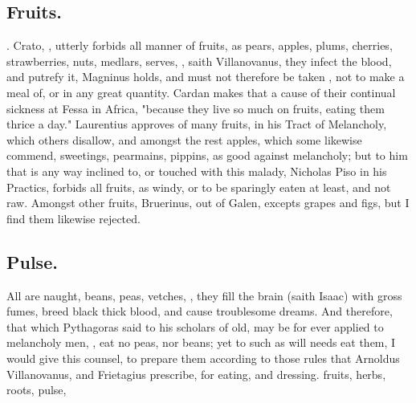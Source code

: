 \subsection{Fruits.}
. Crato,
, utterly forbids all manner of
fruits, as pears, apples, plums, cherries, strawberries, nuts, medlars, serves,
\etc{} , saith Villanovanus, they infect the blood, and
putrefy it, Magninus holds, and must not therefore be taken , not to make a meal of, or in any great quantity.
Cardan makes that a cause of their continual sickness at
Fessa in Africa, "because they live so much on fruits, eating them thrice a
day." Laurentius approves of many fruits, in his Tract of Melancholy, which
others disallow, and amongst the rest apples, which some likewise commend,
sweetings, pearmains, pippins, as good against melancholy; but to him that is
any way inclined to, or touched with this malady, Nicholas
Piso in his Practics, forbids all fruits, as windy, or to be sparingly eaten at
least, and not raw. Amongst other fruits, Bruerinus, out
of Galen, excepts grapes and figs, but I find them likewise rejected.

\subsection{Pulse.}
All  are naught, beans, peas, vetches, \etc{},
they fill the brain (saith Isaac) with gross fumes, breed black thick blood,
and cause troublesome dreams. And therefore, that which Pythagoras said to his
scholars of old, may be for ever applied to melancholy men, , eat no peas, nor beans; yet to such as will needs eat them, I would
give this counsel, to prepare them according to those rules that Arnoldus
Villanovanus, and Frietagius prescribe, for eating, and dressing. fruits,
herbs, roots, pulse, \etc{}

